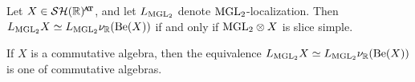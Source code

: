\begin{prop} \label{prop:slice-simple-nu}
  Let $X \in \SHR^{\at}$, and let $L_{\mathrm{MGL}_2}$ denote $\mathrm{MGL}_2$-localization. Then $L_{\mathrm{MGL}_2} X \simeq L_{\mathrm{MGL}_2} \nu_{\mathbb{R}} (\mathrm{Be}(X))$ if and only if $\mathrm{MGL}_2 \otimes X$ is slice simple.

  If $X$ is a commutative algebra, then the equivalence $L_{\mathrm{MGL}_2} X \simeq L_{\mathrm{MGL}_2} \nu_{\mathbb{R}} (\mathrm{Be}(X))$ is one of commutative algebras.
%
%
\end{prop}

